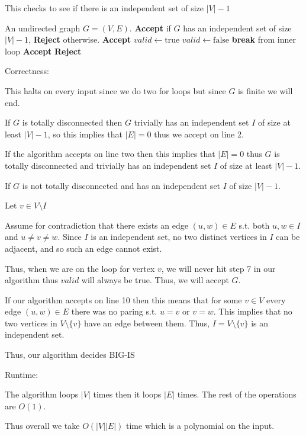 \documentclass[12pt, letterpaper]{article}
\begin{document}
\begin{problemproof}
    This checks to see if there is an independent set of size $|V|-1$
    \begin{algorithm}[H]
    \caption{BIG-IS}
    \begin{algorithmic}[1]
        \Require An undirected graph $G=(V,E)$.
        \Ensure \textbf{Accept} if $G$ has an independent set of size $|V|-1$, \textbf{Reject} otherwise.
          \State \Return \textbf{Accept} \EndIf
            \State $valid \gets \text{true}$
                    \State $valid \gets \text{false}$
                    \State \textbf{break} from inner loop
                \EndIf
            \EndFor
                \State \Return \textbf{Accept} 
            \EndIf
        \EndFor
        \State \Return \textbf{Reject}
        \end{algorithmic}
        \end{algorithm}

    Correctness:

    This halts on every input since we do two for loops but since $G$ is finite we will end.

    If $G$ is totally disconnected then $G$ trivially has an independent set $I$ of size at least $|V|-1$, so this implies that $|E|=0$ thus we accept on line 2.
    
    If the algorithm accepts on line two then this implies that $|E|=0$ thus $G$ is totally disconnected and trivially has an independent set $I$ of size at least $|V|-1$.

    If $G$ is not totally disconnected and has an independent set $I$ of size $|V|-1$.

    Let $v \in V \setminus I$

    Assume for contradiction that there exists an edge $(u,w) \in E$ s.t. both $u,w \in I$ and $u\neq v\neq w$. Since $I$ is an independent set, no two distinct vertices in $I$ can be adjacent, and so such an edge cannot exist.

    Thus, when we are on the loop for vertex $v$, we will never hit step 7 in our algorithm thus $valid$ will always be true. Thus, we will accept $G$.

    If our algorithm accepts on line 10 then this means that for some $v \in V$ every edge $(u,w) \in E$ there was no paring s.t. $u=v$ or $v=w$. This implies that no two vertices in $V \setminus \{v\}$ have an edge between them. Thus, $I=V \setminus \{v\}$ is an independent set.

    Thus, our algorithm decides \textsc{BIG-IS}

    Runtime:

    The algorithm loops $|V|$ times then it loops $|E|$ times. The rest of the operations are $O(1)$.

    Thus overall we take $O(|V||E|)$ time which is a polynomial on the input.
\end{problemproof}
\end{document}
